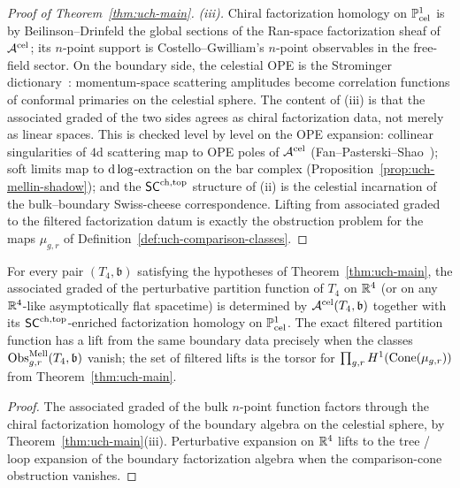 \begin{proof}[Proof of Theorem~\ref{thm:uch-main}]
\emph{(iii).}
Chiral factorization homology on $\mathbb P^1_{\text{cel}}$ is by
Beilinson--Drinfeld \cite{BeilinsonDrinfeldChiral} the global sections
of the Ran-space factorization sheaf of $\mathcal A^{\mathrm{cel}}$; its
$n$-point support is Costello--Gwilliam's $n$-point observables in the
free-field sector. On the boundary side, the celestial OPE is the
Strominger dictionary~\cite{StromingerLectures2018}: momentum-space
scattering amplitudes become correlation functions of conformal
primaries on the celestial sphere. The content of (iii) is that the
associated graded of the two sides agrees as chiral factorization
data, not merely as linear spaces. This is checked level by level on
the OPE expansion:
collinear singularities of $4$d scattering map to OPE poles of
$\mathcal A^{\mathrm{cel}}$ (Fan--Pasterski--Shao~\cite{FanPasterskiShaoCelOPE});
soft limits map to $\mathrm d\log$-extraction on the bar complex
(Proposition~\ref{prop:uch-mellin-shadow}); and the $\mathsf{SC}^{\mathrm{ch,top}}$
structure of (ii) is the celestial incarnation of the bulk--boundary
Swiss-cheese correspondence. Lifting from associated graded to the
filtered factorization datum is exactly the obstruction problem for
the maps $\mu_{g,r}$ of Definition~\ref{def:uch-comparison-classes}.
\end{proof}

\begin{corollary}
\label{cor:uch-bulk-recovery}
For every pair $(T_4,\mathfrak b)$ satisfying the hypotheses of
Theorem~\ref{thm:uch-main}, the associated graded of the perturbative
partition function of $T_4$ on $\mathbb R^4$ (or on any $\mathbb R^4$-like
asymptotically flat spacetime) is determined by
$\mathcal A^{\mathrm{cel}}(T_4,\mathfrak b)$ together with its
$\mathsf{SC}^{\mathrm{ch,top}}$-enriched factorization homology on $\mathbb P^1_{\text{cel}}$.
The exact filtered partition function has a lift from the same
boundary data precisely when the classes
$\operatorname{Obs}^{\mathrm{Mell}}_{g,r}(T_4,\mathfrak b)$ vanish; the set of
filtered lifts is the torsor for
\(\prod_{g,r}H^1(\operatorname{Cone}(\mu_{g,r}))\) from
Theorem~\ref{thm:uch-main}.
\end{corollary}

\begin{proof}
The associated graded of the bulk $n$-point function factors through
the chiral factorization homology of the boundary algebra on the
celestial sphere, by Theorem~\ref{thm:uch-main}(iii). Perturbative
expansion on $\mathbb R^4$ lifts to the tree / loop expansion of the
boundary factorization algebra when the comparison-cone obstruction
vanishes.
\end{proof}

